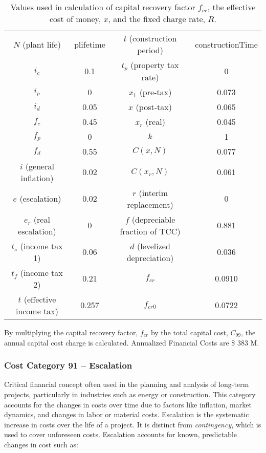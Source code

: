 \begin{table}
    \centering
    \begin{tabular}{cc|cc}
    \hline
      $N$ (plant life)  & plifetime & $t$ (construction period) & constructionTime\\
       $i_c$  & 0.1 & $t_p$ (property tax rate)& 0\\
        $i_p$ & 0 & $x_1$ (pre-tax)& 0.073\\
        $i_d$ & 0.05 & $x$ (post-tax)& 0.065\\
        $f_c$ & 0.45 & $x_r$ (real)& 0.045\\
        $f_p$ & 0 & $k$ & 1\\
        $f_d$ & 0.55 & $C(x,N)$ & 0.077\\
        $i$ (general inflation) & 0.02 & $C(x_r,N)$ & 0.061\\
        $e$  (escalation)& 0.02 & $r$ (interim replacement)& 0\\
        $e_r$ (real escalation) & 0 & $f$ (depreciable fraction of TCC)& 0.881\\
        $t_s$ (income tax 1) & 0.06 & $d$ (levelized depreciation)& 0.036\\
        $t_f$ (income tax 2) & 0.21 & $f_{cr}$ & 0.0910\\
        $t$ (effective income tax) & 0.257 & $f_{cr0}$ & 0.0722\\
    \hline    
    \end{tabular}
    \caption{Values used in calculation of capital recovery factor  $f_{cr}$, the effective cost of money, $x$, and the fixed charge rate, $R$.}
    \label{tab:ec_vals}
    \label{tab:my_label}
\end{table}

By multiplying the capital recovery factor, $f_{cr}$ by the total capital cost, $C_{99}$, the annual capital cost charge is calculated.
Annualized Financial Costs are \$ 383 M.

\subsubsection*{Cost Category 91 – Escalation}
Critical financial concept often used in the planning and analysis of long-term projects, particularly in industries such as energy or construction. This category accounts for the changes in costs over time due to factors like inflation, market dynamics, and changes in labor or material costs. Escalation is the systematic increase in costs over the life of a project. It is distinct from \textit{contingency}, which is used to cover unforeseen costs. Escalation accounts for known, predictable changes in cost such as:

